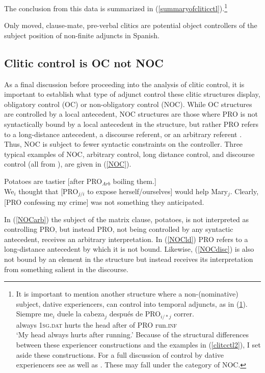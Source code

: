 \documentclass[output=paper,colorlinks,citecolor=brown]{langscibook}
\begin{document}
The conclusion from this data is summarized in (\ref{summaryofcliticctl}).\footnote{It is important to mention another structure where a non-(nominative) subject, dative experiencers, can control into temporal adjuncts, as in (\ref{dative}).
\ea \label{dative}
{
\gll Siempre me$_i$ duele la cabeza$_j$ después de PRO$_{i/*j}$ correr.\\
always \textsc{1sg.dat} hurts the head after of PRO run.\textsc{inf}\\
\glt `My head always hurts after running.'
}
\z
Because of the structural differences between these experiencer constructions and the examples in (\ref{clitcctl2}), I set aside these constructions. For a full discussion of control by dative experiencers see \citet{landau2009} as well as \citet{landa2021}. These may fall under the category of NOC.}

\ea \label{summaryofcliticctl}
Only moved, clause-mate, pre-verbal clitics are potential object controllers of the subject position of non-finite adjuncts in Spanish.
\z

\subsection{Clitic control is OC not NOC} \label{section3.3}
As a final discussion before proceeding into the analysis of clitic control, it is important to
establish what type of adjunct control these clitic structures display, obligatory control (OC) or non-obligatory control (NOC). While OC structures are controlled by a local antecedent, NOC structures are those where PRO is not syntactically bound by a local antecedent in the structure, but rather PRO refers to a long-distance antecedent, a discourse referent, or an arbitrary referent \citep{landau2013}. Thus, NOC is subject to fewer syntactic constraints on the controller. Three typical examples of NOC, arbitrary control, long distance control, and discourse control (all from \citealt{landau2013}), are given in (\ref{NOC}).

\ea \label{NOC}
\ea \label{NOCarb}
{
Potatoes are tastier [after PRO$_{Arb}$ boiling them.]\\  
}
\ex \label{NOCld}
{
We$_i$ thought that [PRO$_{j/i}$ to expose herself/ourselves] would help Mary$_j$. 
}
\ex \label{NOCdisc}
{
Clearly, [PRO confessing my crime] was not something they anticipated. 
}
\z
\z

In (\ref{NOCarb}) the subject of the matrix clause, potatoes, is not interpreted as controlling PRO, but instead PRO, not being controlled by any syntactic antecedent, receives an arbitrary interpretation. In (\ref{NOCld}) PRO refers to a long-distance antecedent by which it is not bound. Likewise, (\ref{NOCdisc}) is also not bound by an element in the structure but instead receives its interpretation from something salient in the discourse.
\end{document}
